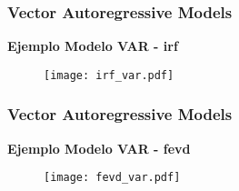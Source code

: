 \documentclass[spanish,xcolor=table]{beamer}
\begin{document}
\begin{frame}
\frametitle{Vector Autoregressive Models}
\textbf{Ejemplo Modelo VAR - irf }

\begin{figure}[t!]
\texttt{[image: irf\_var.pdf]}
\end{figure}

\end{frame}

\begin{frame}
\frametitle{Vector Autoregressive Models}
\textbf{Ejemplo Modelo VAR - fevd}

\begin{figure}[t!]
\texttt{[image: fevd\_var.pdf]}
\end{figure}

\end{frame}
\end{document}
